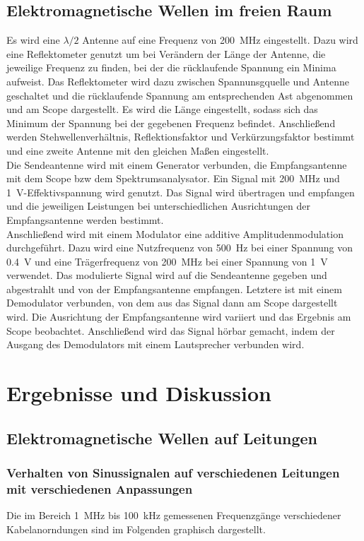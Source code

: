 \documentclass[a4paper,twoside,final]{article}
\begin{document}
\subsection{Elektromagnetische Wellen im freien Raum}
Es wird eine $\lambda/2$ Antenne auf eine Frequenz von \SI{200}{\mega\hertz} eingestellt. Dazu wird eine Reflektometer genutzt um bei Verändern der Länge der Antenne, die jeweilige Frequenz zu finden, bei der die rücklaufende Spannung ein Minima aufweist. Das Reflektometer wird dazu zwischen Spannunsgquelle und Antenne geschaltet und die rücklaufende Spannung am entsprechenden Ast abgenommen und am Scope dargestellt. Es wird die Länge eingestellt, sodass sich das Minimum der Spannung bei der gegebenen Frequenz befindet. Anschließend werden Stehwellenverhältnis, Reflektionsfaktor und Verkürzungsfaktor bestimmt und eine zweite Antenne mit den gleichen Maßen eingestellt. \\
Die Sendeantenne wird mit einem Generator verbunden, die Empfangsantenne mit dem Scope bzw dem Spektrumsanalysator. Ein Signal mit \SI{200}{\mega\hertz} und \SI{1}{\volt}-Effektivspannung wird genutzt. Das Signal wird übertragen und empfangen und die jeweiligen Leistungen bei unterschiedlichen Ausrichtungen der Empfangsantenne werden bestimmt. \\
Anschließend wird mit einem Modulator eine additive Amplitudenmodulation durchgeführt. Dazu wird eine Nutzfrequenz von \SI{500}{\hertz} bei einer Spannung von \SI{0,4}{\volt} und eine Trägerfrequenz von \SI{200}{\mega\hertz} bei einer Spannung von \SI{1}{\volt} verwendet. Das modulierte Signal wird auf die Sendeantenne gegeben und abgestrahlt und von der Empfangsantenne empfangen. Letztere ist mit einem Demodulator verbunden, von dem aus das Signal dann am Scope dargestellt wird. Die Ausrichtung der Empfangsantenne wird variiert und das Ergebnis am Scope beobachtet. Anschließend wird das Signal hörbar gemacht, indem der Ausgang des Demodulators mit einem Lautsprecher verbunden wird.
\newpage
\section{Ergebnisse und Diskussion}
\subsection{Elektromagnetische Wellen auf Leitungen}
\subsubsection{Verhalten von Sinussignalen auf verschiedenen Leitungen mit verschiedenen Anpassungen}
Die im Bereich \SI{1}{\mega\hertz} bis \SI{100}{\kilo\hertz} gemessenen Frequenzgänge verschiedener Kabelanorndungen sind im Folgenden graphisch dargestellt.
\end{document}
